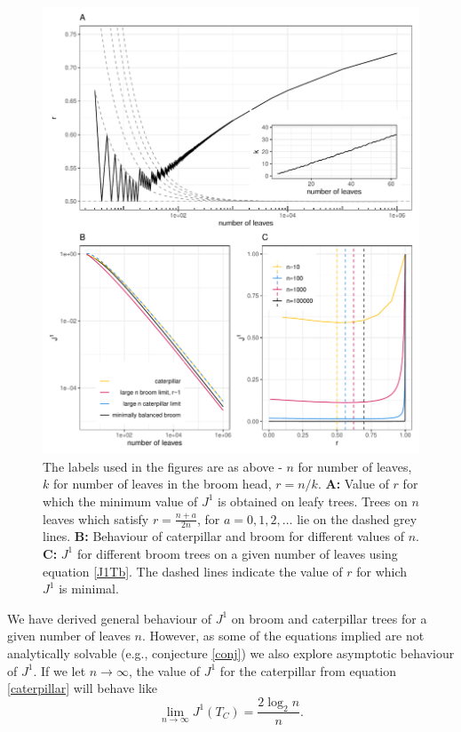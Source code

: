     \begin{figure}[h!]
        \begin{center}
        \includegraphics[width = \textwidth]{Chapter_2/figures/figures_updated.pdf}
        \caption{The labels used in the figures are as above - $n$ for number of leaves, $k$ for number of leaves in the broom head, $r=n/k$. \textbf{A:} Value of $r$ for which the minimum value of $J^1$ is obtained on leafy trees. Trees on $n$ leaves which satisfy $r = \frac{n+a}{2n}$, for $a=0,1,2,\dots$ lie on the dashed grey lines. \textbf{B:} Behaviour of caterpillar and broom for different values of $n$. \textbf{C:} $J^1$ for different broom trees on a given number of leaves using equation \eqref{J1Tb}. The dashed lines indicate the value of $r$ for which $J^1$ is minimal.}
        \label{Rfigures}
        \end{center}
    \end{figure}

We have derived general behaviour of $J^1$ on broom and caterpillar trees for a given number of leaves $n$. However, as some of the equations implied are not analytically solvable (e.g., conjecture \ref{conj}) we also explore asymptotic behaviour of $J^1$.
If we let $n\to\infty$, the value of $J^1$ for the caterpillar from equation \eqref{caterpillar} will behave like
    \begin{equation}
        \lim_{n\to\infty} J^1(T_C) = \frac{2\log_2n}{n}. \label{caterpillarlim}
\end{equation}

